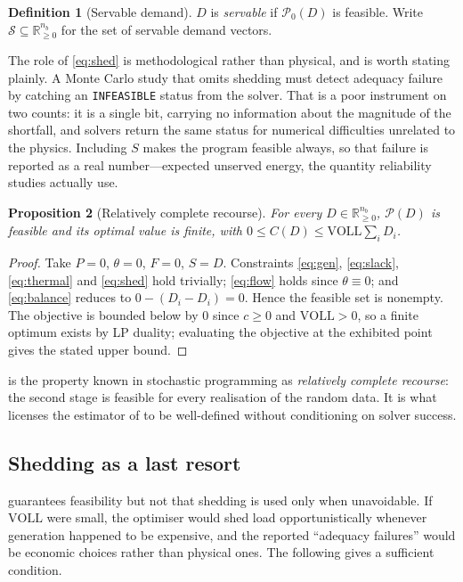 \documentclass[11pt,a4paper]{article}
\theoremstyle{definition}
\newtheorem{definition}{Definition}[section]
\theoremstyle{plain}
\newtheorem{proposition}[definition]{Proposition}
\theoremstyle{remark}
\newcommand{\R}{\mathbb{R}}
\newcommand{\VOLL}{\mathrm{VOLL}}
\begin{document}
\begin{definition}[Servable demand]\label{def:servable}
$D$ is \emph{servable} if $\mathcal{P}_0(D)$ is feasible. Write
$\mathcal{S} \subseteq \R^{n_b}_{\ge 0}$ for the set of servable demand vectors.
\end{definition}

The role of \eqref{eq:shed} is methodological rather than physical, and is worth
stating plainly. A Monte Carlo study that omits shedding must detect adequacy
failure by catching an \texttt{INFEASIBLE} status from the solver. That is a poor
instrument on two counts: it is a single bit, carrying no information about the
magnitude of the shortfall, and solvers return the same status for numerical
difficulties unrelated to the physics. Including $S$ makes the program feasible
always, so that failure is reported as a real number---expected unserved energy,
the quantity reliability studies actually use.

\begin{proposition}[Relatively complete recourse]\label{prop:recourse}
For every $D \in \R^{n_b}_{\ge 0}$, $\mathcal{P}(D)$ is feasible and its optimal
value is finite, with $0 \le C(D) \le \VOLL \sum_i D_i$.
\end{proposition}

\begin{proof}
Take $P = 0$, $\theta = 0$, $F = 0$, $S = D$. Constraints \eqref{eq:gen},
\eqref{eq:slack}, \eqref{eq:thermal} and \eqref{eq:shed} hold trivially;
\eqref{eq:flow} holds since $\theta \equiv 0$; and \eqref{eq:balance} reduces to
$0 - (D_i - D_i) = 0$. Hence the feasible set is nonempty. The objective is
bounded below by $0$ since $c \ge 0$ and $\VOLL > 0$, so a finite optimum exists
by LP duality; evaluating the objective at the exhibited point gives the stated
upper bound.
\end{proof}

 is the property known in stochastic programming as
\emph{relatively complete recourse}: the second stage is feasible for every
realisation of the random data. It is what licenses the estimator of
 to be well-defined without conditioning on solver success.

\subsection{Shedding as a last resort}

 guarantees feasibility but not that shedding is used only
when unavoidable. If $\VOLL$ were small, the optimiser would shed load
opportunistically whenever generation happened to be expensive, and the reported
``adequacy failures'' would be economic choices rather than physical ones. The
following gives a sufficient condition.
\end{document}
